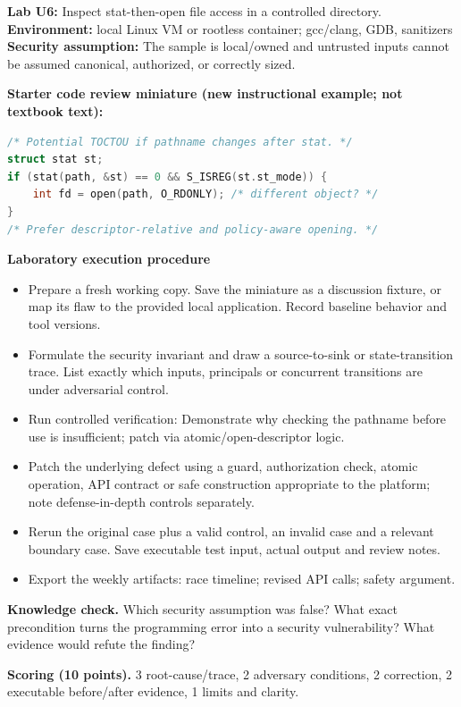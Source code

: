 \documentclass[10pt,letterpaper]{article}
\begin{document}
\begin{insight}\textbf{Lab U6:} Inspect stat-then-open file access in a controlled directory.\\\textbf{Environment:} local Linux VM or rootless container; gcc/clang, GDB, sanitizers\\\textbf{Security assumption:} The sample is local/owned and untrusted inputs cannot be assumed canonical, authorized, or correctly sized.\end{insight}
\textbf{Starter code review miniature (new instructional example; not textbook text):}
\begin{lstlisting}[language=C]
/* Potential TOCTOU if pathname changes after stat. */
struct stat st;
if (stat(path, &st) == 0 && S_ISREG(st.st_mode)) {
    int fd = open(path, O_RDONLY); /* different object? */
}
/* Prefer descriptor-relative and policy-aware opening. */
\end{lstlisting}
\textbf{Laboratory execution procedure}
\begin{itemize}[leftmargin=*,itemsep=2pt]
\item Prepare a fresh working copy. Save the miniature as a discussion fixture, or map its flaw to the provided local application. Record baseline behavior and tool versions.
\item Formulate the security invariant and draw a source-to-sink or state-transition trace. List exactly which inputs, principals or concurrent transitions are under adversarial control.
\item Run controlled verification: Demonstrate why checking the pathname before use is insufficient; patch via atomic/open-descriptor logic.
\item Patch the underlying defect using a guard, authorization check, atomic operation, API contract or safe construction appropriate to the platform; note defense-in-depth controls separately.
\item Rerun the original case plus a valid control, an invalid case and a relevant boundary case. Save executable test input, actual output and review notes.
\item Export the weekly artifacts: race timeline; revised API calls; safety argument.
\end{itemize}
\textbf{Knowledge check.} Which security assumption was false? What exact precondition turns the programming error into a security vulnerability? What evidence would refute the finding?

\textbf{Scoring (10 points).} 3 root-cause/trace, 2 adversary conditions, 2 correction, 2 executable before/after evidence, 1 limits and clarity.
\end{document}
